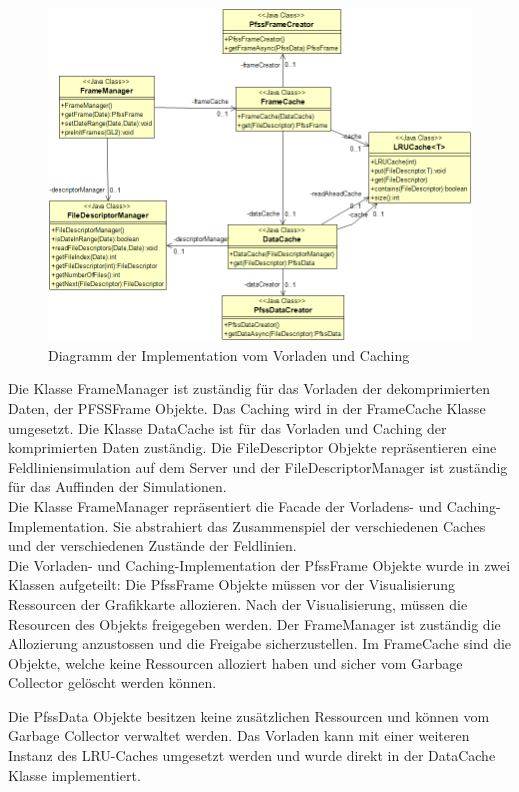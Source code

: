 \begin{figure}[!htbp]
	\center
	\includegraphics[width=1\textwidth,keepaspectratio]{./pictures/implementation/architectureCache.png}
	\caption{Diagramm der Implementation vom Vorladen und Caching}
	\label{implementation:architektur:caching}
\end{figure}
Die Klasse FrameManager ist zuständig für das Vorladen der dekomprimierten Daten, der PFSSFrame Objekte. Das Caching wird in der FrameCache Klasse umgesetzt. Die Klasse DataCache ist für das Vorladen und Caching der komprimierten Daten zuständig. Die FileDescriptor Objekte repräsentieren eine Feldliniensimulation auf dem Server und der FileDescriptorManager ist zuständig für das Auffinden der Simulationen.\\
Die Klasse FrameManager repräsentiert die Facade der Vorladens- und Caching-Implementation. Sie abstrahiert das Zusammenspiel der verschiedenen Caches und der verschiedenen Zustände der Feldlinien.\\
Die Vorladen- und Caching-Implementation der PfssFrame Objekte wurde in zwei Klassen aufgeteilt: Die PfssFrame Objekte müssen vor der Visualisierung Ressourcen der Grafikkarte allozieren. Nach der Visualisierung, müssen die Resourcen des Objekts freigegeben werden. Der FrameManager ist zuständig die Allozierung anzustossen und die Freigabe sicherzustellen. Im FrameCache sind die Objekte, welche keine Ressourcen alloziert haben und sicher vom Garbage Collector gelöscht werden können.

Die PfssData Objekte besitzen keine zusätzlichen Ressourcen und können vom Garbage Collector verwaltet werden. Das Vorladen kann mit einer weiteren Instanz des LRU-Caches umgesetzt werden und wurde direkt in der DataCache Klasse implementiert.

